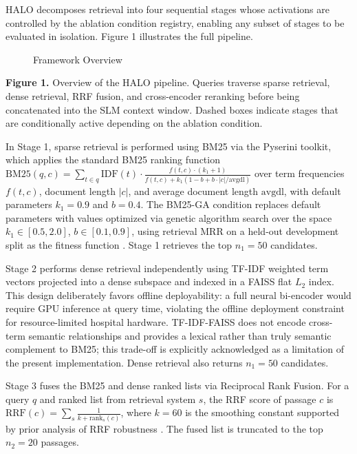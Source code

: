 \documentclass{article}
\begin{document}
HALO decomposes retrieval into four sequential stages whose activations are controlled by the ablation condition registry, enabling any subset of stages to be evaluated in isolation. Figure 1 illustrates the full pipeline.

\begin{figure}[t]
\centering

\caption{Framework Overview}
\label{fig:framework_overview}
\end{figure}

\textbf{Figure 1.} Overview of the HALO pipeline. Queries traverse sparse retrieval, dense retrieval, RRF fusion, and cross-encoder reranking before being concatenated into the SLM context window. Dashed boxes indicate stages that are conditionally active depending on the ablation condition.

In Stage 1, sparse retrieval is performed using BM25 via the Pyserini toolkit, which applies the standard BM25 ranking function $\text{BM25}(q, c) = \sum_{t \in q} \text{IDF}(t) \cdot \frac{f(t,c) \cdot (k_1 + 1)}{f(t,c) + k_1(1 - b + b \cdot |c|/\text{avgdl})}$ over term frequencies $f(t,c)$, document length $|c|$, and average document length $\text{avgdl}$, with default parameters $k_1 = 0.9$ and $b = 0.4$. The BM25-GA condition replaces default parameters with values optimized via genetic algorithm search over the space $k_1 \in [0.5, 2.0]$, $b \in [0.1, 0.9]$, using retrieval MRR on a held-out development split as the fitness function \cite{katoch2020review}. Stage 1 retrieves the top $n_1 = 50$ candidates.

Stage 2 performs dense retrieval independently using TF-IDF weighted term vectors projected into a dense subspace and indexed in a FAISS flat $L_2$ index. This design deliberately favors offline deployability: a full neural bi-encoder would require GPU inference at query time, violating the offline deployment constraint for resource-limited hospital hardware. TF-IDF-FAISS does not encode cross-term semantic relationships and provides a lexical rather than truly semantic complement to BM25; this trade-off is explicitly acknowledged as a limitation of the present implementation. Dense retrieval also returns $n_1 = 50$ candidates.

Stage 3 fuses the BM25 and dense ranked lists via Reciprocal Rank Fusion. For a query $q$ and ranked list from retrieval system $s$, the RRF score of passage $c$ is $\text{RRF}(c) = \sum_{s} \frac{1}{k + \text{rank}_s(c)}$, where $k = 60$ is the smoothing constant supported by prior analysis of RRF robustness \cite{cormack2009reciprocal}. The fused list is truncated to the top $n_2 = 20$ passages.
\end{document}
